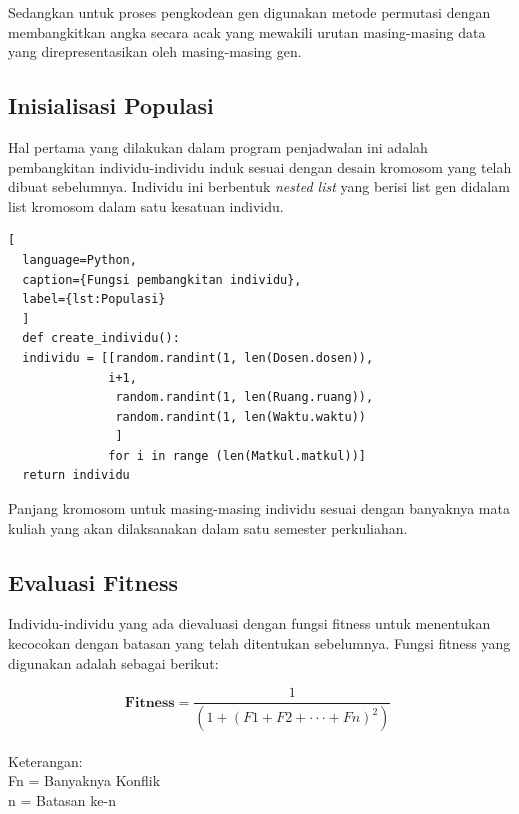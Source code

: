 Sedangkan untuk proses pengkodean gen digunakan metode permutasi dengan \linebreak membangkitkan angka secara acak yang mewakili urutan masing-masing data yang \linebreak direpresentasikan oleh masing-masing gen.

\subsection{Inisialisasi Populasi}
Hal pertama yang dilakukan dalam program penjadwalan ini adalah pembangkitan \linebreak individu-individu induk sesuai dengan desain kromosom yang telah dibuat sebelumnya. Individu ini berbentuk \emph{nested list} yang berisi list gen didalam list kromosom dalam satu kesatuan individu.  
\begin{lstlisting}[
  language=Python,
  caption={Fungsi pembangkitan individu},
  label={lst:Populasi}
  ]
  def create_individu():
  individu = [[random.randint(1, len(Dosen.dosen)), 
              i+1,
               random.randint(1, len(Ruang.ruang)),
               random.randint(1, len(Waktu.waktu))
               ] 
              for i in range (len(Matkul.matkul))]
  return individu
\end{lstlisting}
Panjang kromosom untuk masing-masing individu sesuai dengan banyaknya mata kuliah yang akan dilaksanakan dalam satu semester perkuliahan.
\subsection{Evaluasi Fitness}
  
  Individu-individu yang ada dievaluasi dengan fungsi fitness untuk menentukan kecocokan dengan batasan yang telah ditentukan sebelumnya. 
  Fungsi fitness yang digunakan adalah sebagai berikut:
  
  \begin{equation}
    \label{eq:fitness2}
    \mathbf{Fitness} = \frac{1}{(1 + (F1 + F2 + \cdot \cdot \cdot +  Fn)^2)}\; 
  \end{equation}\\
  Keterangan:\\
  Fn = Banyaknya Konflik\\
  n  = Batasan ke-n

